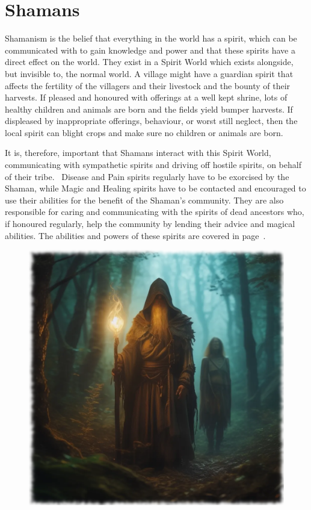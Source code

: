 \section{Shamans}
Shamanism is the belief that everything in the world has a spirit, which can be communicated with to gain knowledge and power and that these spirits have a direct effect on the world. They exist in a Spirit World which exists alongside, but invisible to, the normal world. A village might have a guardian spirit that affects the fertility of the villagers and their livestock and the bounty of their harvests. If pleased and honoured with offerings at a well kept shrine, lots of healthy children and animals are born and the fields yield bumper harvests. If displeased by inappropriate offerings, behaviour, or worst still neglect, then the local spirit can blight crops and make sure no children or animals are born.

It is, therefore, important that Shamans interact with this Spirit World, communicating with sympathetic spirits and driving off hostile spirits, on behalf of their tribe.  Disease and Pain spirits regularly have to be exorcised by the Shaman, while Magic and Healing spirits have to be contacted and encouraged to use their abilities for the benefit of the Shaman’s community. They are also responsible for caring and communicating with the spirits of dead ancestors who, if honoured regularly, help the community by lending their advice and magical abilities. The abilities and powers of these spirits are covered in page~\pageref{sec:spirits}.

\begin{figure}[h]
\begin{center}
\includegraphics[scale=0.24]{img/ai-images/shaman.png}
\end{center}
\end{figure}

